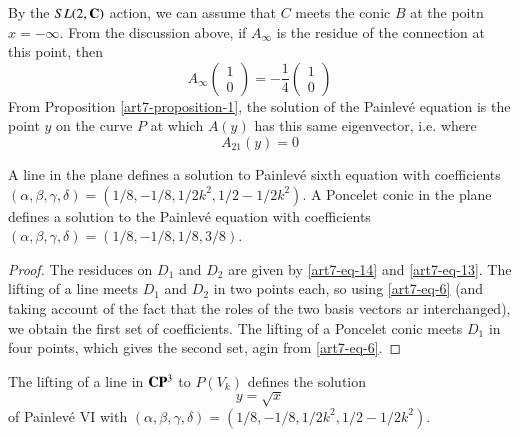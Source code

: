 \begin{remark*}
By the $SL(2, \mathbf{C})$ action, we can assume that $C$ meets the conic $B$ at the poitn $x=-\infty$. From the discussion above, if $A_{\infty}$ is the residue of the connection at this point, then
$$
A_{\infty}
\left(
\begin{matrix}
1\\
0
\end{matrix}
\right) 
= -\dfrac{1}{4}
\left(
\begin{matrix}
1\\
0
\end{matrix}
\right) 
$$
From Proposition \ref{art7-proposition-1}, the solution of the Painlev\'e equation is the point $y$ on the curve $P$ at which $A(y)$ has this same eigenvector, i.e. where
$$
A_{21}(y)=0
$$
\end{remark*}

\begin{prop}\label{art7-proposition-5}
A line in the plane defines a solution to Painlev\'e sixth equation with coefficients $(\alpha, \beta, \gamma, \delta) = (1/8, -1/8,1/2k^{2},1/2-1/2k^{2})$. A Poncelet conic in the plane defines a solution to the Painlev\'e equation with coefficients $(\alpha, \beta,\gamma, \delta) = (1/8, -1/8, 1/8, 3/8)$.
\end{prop}

\begin{proof}
The residuces on $D_{1}$ and $D_{2}$ are given by \eqref{art7-eq-14} and \eqref{art7-eq-13}. The lifting of a line meets $D_{1}$ and $D_{2}$ in two points each, so using \eqref{art7-eq-6} (and taking account of the fact that the roles of the two basis vectors ar interchanged), we obtain the first set of coefficients. The lifting of a Poncelet conic meets $D_{1}$ in  four points, which gives the second set, agin from \eqref{art7-eq-6}.
\end{proof}

\begin{prop}\label{art7-proposition-6}
The lifting of a line in $\mathbf{C}\mathbf{P}^{3}$ to $P(V_{k})$ defines the solution
$$
y = \sqrt{x}
$$
of Painlev\'e VI with $(\alpha, \beta, \gamma, \delta)= (1/8,-1/8, 1/2k^{2},1/2-1/2k^{2})$.
\end{prop}

